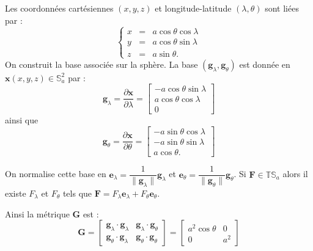 Les coordonnées cartésiennes $(x,y,z)$ et longitude-latitude $(\lambda, \theta)$ sont liées par :
\begin{equation}
\left\lbrace 
\begin{array}{rcl}
x & = & a \cos \theta \cos \lambda \\
y & = & a \cos \theta \sin \lambda \\
z & = & a \sin \theta.
\end{array}
\right.
\end{equation}
On construit la base associée sur la sphère. La base $( \mathbf{g}_{\lambda}, \mathbf{g}_{\theta})$ est donnée en $\mathbf{x} (x,y,z) \in \mathbb{S}_a^2$ par :
\begin{equation}
\mathbf{g}_{\lambda} = \dfrac{\partial \mathbf{x}}{\partial \lambda} = \begin{bmatrix}
- a \cos \theta \sin \lambda \\ 
a \cos \theta \cos \lambda \\ 
0
\end{bmatrix} 
\end{equation}
ainsi que 
\begin{equation}\label{coord_latlon}
\mathbf{g}_{\theta} = \dfrac{\partial \mathbf{x}}{\partial \theta} = \begin{bmatrix}
- a \sin \theta \cos \lambda \\ 
- a \sin \theta \sin \lambda \ \\ 
a \cos \theta.
\end{bmatrix} 
\end{equation}

\begin{remarque}
\label{base_lonlat}
On normalise cette base en $\mathbf{e}_{\lambda} = \dfrac{1}{\| \mathbf{g}_{\lambda} \|} \mathbf{g}_{\lambda}$ et $\mathbf{e}_{\theta} = \dfrac{1}{\| \mathbf{g}_{\theta} \|} \mathbf{g}_{\theta}$. Si $\mathbf{F} \in \mathbb{T}\mathbb{S}_a$ alors il existe $F_{\lambda}$ et $F_{\theta}$ tels que $\mathbf{F} = F_{\lambda} \mathbf{e}_{\lambda} + F_{\theta} \mathbf{e}_{\theta}$.
\end{remarque}

Ainsi la métrique $\mathbf{G}$ est :
\begin{equation}
\mathbf{G} = 
\begin{bmatrix}
\mathbf{g}_{\lambda} \cdot \mathbf{g}_{\lambda} & \mathbf{g}_{\lambda} \cdot \mathbf{g}_{\theta} \\
\mathbf{g}_{\theta} \cdot \mathbf{g}_{\lambda} & \mathbf{g}_{\theta} \cdot \mathbf{g}_{\theta}
\end{bmatrix}
 =
\begin{bmatrix}
a^2 \cos \theta & 0 \\
0 & a^2
\end{bmatrix}
\end{equation}

